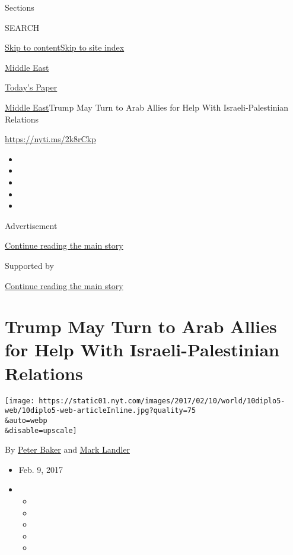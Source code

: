 Sections

SEARCH

\protect\hyperlink{site-content}{Skip to
content}\protect\hyperlink{site-index}{Skip to site index}

\href{https://www.nytimes.com/section/world/middleeast}{Middle East}

\href{https://myaccount.nytimes.com/auth/login?response_type=cookie\&client_id=vi}{}

\href{https://www.nytimes.com/section/todayspaper}{Today's Paper}

\href{/section/world/middleeast}{Middle East}\textbar{}Trump May Turn to
Arab Allies for Help With Israeli-Palestinian Relations

\url{https://nyti.ms/2k8rCkp}

\begin{itemize}
\item
\item
\item
\item
\item
\end{itemize}

Advertisement

\protect\hyperlink{after-top}{Continue reading the main story}

Supported by

\protect\hyperlink{after-sponsor}{Continue reading the main story}

\hypertarget{trump-may-turn-to-arab-allies-for-help-with-israeli-palestinian-relations}{%
\section{Trump May Turn to Arab Allies for Help With Israeli-Palestinian
Relations}\label{trump-may-turn-to-arab-allies-for-help-with-israeli-palestinian-relations}}

\texttt{[image: https://static01.nyt.com/images/2017/02/10/world/10diplo5-web/10diplo5-web-articleInline.jpg?quality=75\\\&auto=webp\\\&disable=upscale]}

By \href{http://www.nytimes.com/by/peter-baker}{Peter Baker} and
\href{http://www.nytimes.com/by/mark-landler}{Mark Landler}

\begin{itemize}
\item
  Feb. 9, 2017
\item
  \begin{itemize}
  \item
  \item
  \item
  \item
  \item
  \end{itemize}
\end{itemize}

